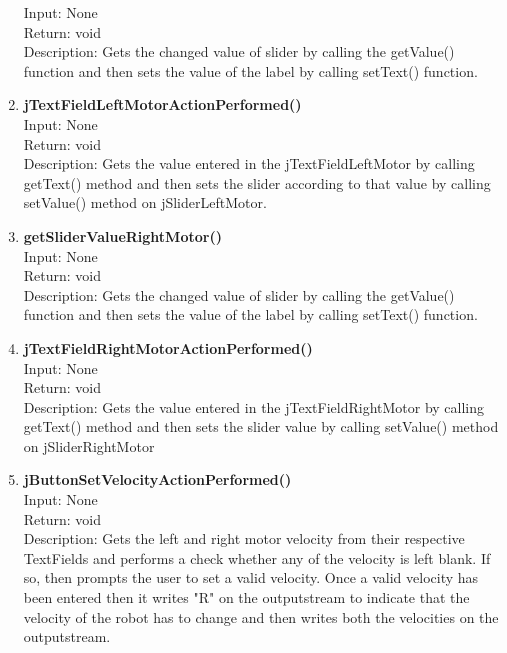 \documentclass{article}
\begin{document}
\begin{enumerate}
		Input: None\\
		Return: void\\
		Description: Gets the changed value of slider by calling the getValue() function and then sets the value of the label by calling setText() function. \vspace{0.5cm} \\
		\item \textbf{jTextFieldLeftMotorActionPerformed()} \vspace{0.25cm} \\
		Input: None\\
		Return: void\\
		Description: Gets the value entered in the jTextFieldLeftMotor by calling getText() method and then sets the slider according to that value by calling setValue() method on jSliderLeftMotor. \vspace{0.5cm} \\
		\item \textbf{getSliderValueRightMotor()} \vspace{0.25cm} \\
		Input: None\\
		Return: void\\
		Description: Gets the changed value of slider by calling the getValue() function and then sets the value of the label by calling
		setText() function. \vspace{0.5cm} \\
		\item \textbf{jTextFieldRightMotorActionPerformed()} \vspace{0.25cm} \\
		Input: None\\
		Return: void\\
		Description: Gets the value entered in the jTextFieldRightMotor by calling getText() method and then sets the slider value by calling setValue() method on jSliderRightMotor \vspace{0.5cm} \\
		\item \textbf{jButtonSetVelocityActionPerformed()} \vspace{0.25cm} \\
		Input: None\\
		Return: void\\
		Description: Gets the left and right motor velocity from their respective TextFields and performs a check whether any of the velocity is left blank. If so, then prompts the user to set a valid velocity. Once a valid velocity has been entered then it writes "R" on the outputstream to indicate that the velocity of the robot has to change and then writes both the velocities on the outputstream. \vspace{0.5cm} \\

\end{enumerate}
\end{document}
